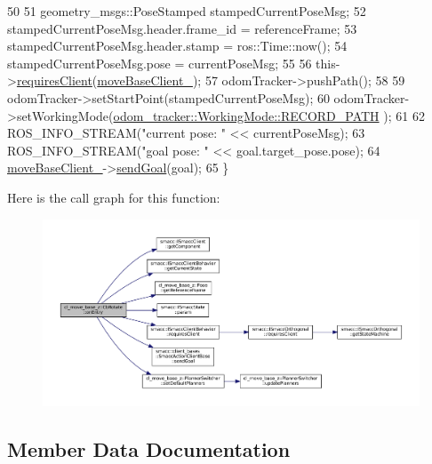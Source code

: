 \begin{DoxyCode}
50 
51     geometry\_msgs::PoseStamped stampedCurrentPoseMsg;
52     stampedCurrentPoseMsg.header.frame\_id = referenceFrame;
53     stampedCurrentPoseMsg.header.stamp = ros::Time::now();
54     stampedCurrentPoseMsg.pose = currentPoseMsg;
55 
56     this->\hyperlink{classsmacc_1_1ISmaccClientBehavior_a32b16e99e3b4cb289414203dc861a440}{requiresClient}(\hyperlink{classcl__move__base__z_1_1CbMoveBaseClientBehaviorBase_ab2ef219464cfac8659b4a87c8d0db6d5}{moveBaseClient\_});
57     odomTracker->pushPath();
58 
59     odomTracker->setStartPoint(stampedCurrentPoseMsg);
60     odomTracker->setWorkingMode(\hyperlink{namespacecl__move__base__z_1_1odom__tracker_ac46b05813b2791604f6cd0a39ace3ef8a023bc3adf68871ef7a0c616765ac80a7}{odom\_tracker::WorkingMode::RECORD\_PATH}
      );
61 
62     ROS\_INFO\_STREAM(\textcolor{stringliteral}{"current pose: "} << currentPoseMsg);
63     ROS\_INFO\_STREAM(\textcolor{stringliteral}{"goal pose: "} << goal.target\_pose.pose);
64     \hyperlink{classcl__move__base__z_1_1CbMoveBaseClientBehaviorBase_ab2ef219464cfac8659b4a87c8d0db6d5}{moveBaseClient\_}->\hyperlink{classsmacc_1_1client__bases_1_1SmaccActionClientBase_a9c47a5094ac8afb01680307fe5eca922}{sendGoal}(goal);
65 \}
\end{DoxyCode}
Here is the call graph for this function\+:
\nopagebreak
\begin{figure}[H]
\begin{center}
\leavevmode
\includegraphics[width=350pt]{classcl__move__base__z_1_1CbRotate_a316ee51ecfd3f10fd1edae0d7d3b26c0_cgraph}
\end{center}
\end{figure}


\subsection{Member Data Documentation}
\mbox{\label{classcl__move__base__z_1_1CbRotate_a2b57c5f392fde0a3bf38f5fd6e1bde11}} 
